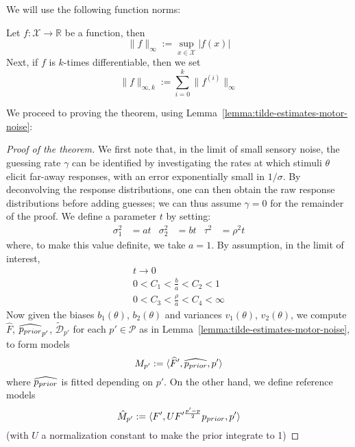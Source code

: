 We will use the following function norms:
\begin{defin}\label{def:function-norms}
Let $f : \mathcal{X} \rightarrow \mathbb{R}$ be a function, then
\begin{equation}
    \|f\|_\infty := \sup_{x \in \mathcal{X}} |f(x)|
\end{equation}
Next, if $f$ is $k$-times differentiable, then we set
\begin{equation}
    \|f\|_{\infty, k} := \sum_{i=0}^k \|f^{(i)}\|_\infty
\end{equation}
\end{defin}
We proceed to proving the theorem, using Lemma~\ref{lemma:tilde-estimates-motor-noise}:
\begin{proof}[Proof of the theorem]
We first note that, in the limit of small sensory noise, the guessing rate $\gamma$ can be identified by investigating the rates at which stimuli $\theta$ elicit far-away responses, with an error exponentially small in $1/\sigma$. 
By deconvolving the response distributions, one can then obtain the raw response distributions before adding guesses; we can thus assume $\gamma=0$ for the remainder of the proof.
We define a parameter $t$ by setting:
\begin{align*}
    \sigma_1^2 &= at &
    \sigma_2^2 &= bt &
    \tau^2 &= \rho^2 t
\end{align*}
where, to make this value definite, we take $a=1$.
By assumption, in the limit of interest, 
\begin{align*}
t \rightarrow 0 \\
    0 < C_1 < \frac{b}{a} < C_2 < 1 \\
    0 < C_3 < \frac{\rho}{a} < C_4 < \infty
\end{align*}
Now given the biases $b_1(\theta)$, $b_2(\theta)$ and variances $v_1(\theta)$, $v_2(\theta)$, we compute $\widehat{F}$, $\widehat{p_{prior}}_{p'}$, $\tilde{\mathcal{D}}_{p'}$ for each $p' \in \mathcal{P}$ as in Lemma~\ref{lemma:tilde-estimates-motor-noise}, to form models 
\begin{equation}
M_{p'} := \langle \widehat{F}', \widehat{p_{prior}}, p'\rangle    
\end{equation}
where $\widehat{p_{prior}}$ is fitted depending on $p'$.
On the other hand, we define reference models
\begin{equation}
    \hat{M}_{p'} := \langle F', U F'^{\frac{p'-p}{2}} p_{prior}, p'\rangle
\end{equation}
(with $U$ a normalization constant to make the prior integrate to 1)

\end{proof}
